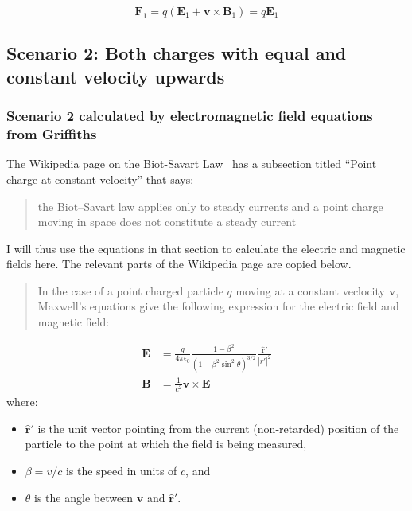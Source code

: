 \documentclass[a4paper]{article}
\theoremstyle{plain}
\theoremstyle{definition}
\newcommand{\rhat}{\hat{\mathbf{r}}}
\newcommand{\vect}[1]{\mathbf{#1}}
\begin{document}
\begin{equation}
\vect{F}_1 = q(\vect{E}_1 + \vect{v} \times \vect{B}_1)
           = q \vect{E}_1   \label{eq:F1}
\end{equation}


\subsection{Scenario 2: Both charges with equal and constant velocity upwards}

\subsubsection{Scenario 2 calculated by electromagnetic field equations from Griffiths}

The Wikipedia page on the Biot-Savart
Law~\cite{EMFieldFromPointCharge} has a subsection titled ``Point
charge at constant velocity'' that says:

\begin{quote}
the Biot–Savart law applies only to steady currents and a point charge
moving in space does not constitute a steady current
\end{quote}

I will thus use the equations in that section to calculate the
electric and magnetic fields here.  The relevant parts of the
Wikipedia page are copied below.

\begin{quote}
In the case of a point charged particle $q$ moving at a constant
veclocity $\vect{v}$, Maxwell's equations give the following
expression for the electric field and magnetic field:
\end{quote}
\begin{align}
\vect{E} & = \frac{q}{4 \pi \epsilon_0} \frac{1-\beta^2}{(1-\beta^2 \sin^2 \theta)^{3/2}} \frac{{\rhat}'}{|r'|^2} \label{eq:EforPtChg} \\
\vect{B} & = \frac{1}{c^2} \vect{v} \times \vect{E} \label{eq:BforPtChg}
\end{align}
where:
\begin{itemize}
    \item ${\rhat}'$ is the unit vector pointing from the current
      (non-retarded) position of the particle to the point at which
      the field is being measured,
    \item $\beta = v/c$ is the speed in units of $c$, and
    \item $\theta$ is the angle between $\vect{v}$ and ${\rhat}'$.
\end{itemize}
\end{document}
